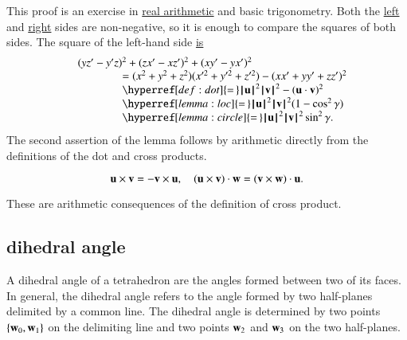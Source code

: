 \begin{proved}  This proof is an exercise in \hyperref[back:analysis]{real arithmetic} and basic trigonometry.
   Both the \hyperref[eqn:dot]{left} and \hyperref[lemma:sin-pos]{right} sides are non-negative, so it is enough to compare the
   squares of both sides.  The square of the left-hand side \hyperref[def:cross]{is}
   $$
   \begin{array}{lll}
   &(y z'- y'z)^2 + (z x' - x z')^2 + (x y' - y x')^2 \\
    &\qquad\qquad=
   (x^2 + y^2 + z^2)(x'^2 + y'^2 + z'^2) - (x x' + y y' + z z')^2
   \\&\qquad\qquad \hyperref[def:dot]{=\,} 
    \normo{\u}^2\normo{\v}^2 - (\u\cdot \v)^2 \\
   &\qquad\qquad\hyperref[lemma:loc]{=\,} \normo{\u}^2\normo{\v}^2 ( 1 - \cos^2\gamma)\\
   &\qquad\qquad\hyperref[lemma:circle]{=\,} \normo{\u}^2\normo{\v}^2 \sin^2\gamma.
   \end{array}
   $$
The second assertion of the lemma follows by arithmetic directly from the definitions of the dot and cross products.
\swallowed\end{proved}


\begin{lemma}
    $$
    {\mathbf u}\times {\mathbf v} = -{\mathbf v}\times {\mathbf u},\quad
    ({\mathbf u}\times {\mathbf v})\cdot {\mathbf w} = ({\mathbf v}\times {\mathbf w})\cdot {\mathbf u}.
    $$
\end{lemma}

\begin{proved}
These are arithmetic consequences of the definition of cross product.
\swallowed\end{proved}



\subsection{dihedral angle}

A dihedral angle of a tetrahedron are the angles formed between two of its faces. In general,
the dihedral angle refers to the angle formed by two half-planes
delimited by a common line.  The dihedral angle is determined
by two points $\{{\mathbf w}_0,{\mathbf w}_1\}$ on the delimiting line
and two points ${\mathbf w}_2$ and ${\mathbf w}_3$ on the two half-planes.
%
%
%
%
%

